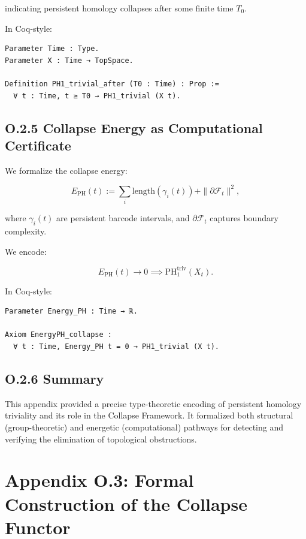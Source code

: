\documentclass[11pt]{article}
\begin{document}
indicating persistent homology collapses after some finite time \( T_0 \).

In Coq-style:

\begin{lstlisting}[language=Coq]
Parameter Time : Type.
Parameter X : Time → TopSpace.

Definition PH1_trivial_after (T0 : Time) : Prop :=
  ∀ t : Time, t ≥ T0 → PH1_trivial (X t).
\end{lstlisting}

\subsection*{O.2.5 Collapse Energy as Computational Certificate}

We formalize the collapse energy:

\[
E_{\mathrm{PH}}(t) := \sum_i \mathrm{length}(\gamma_i(t)) + \|\partial \mathcal{F}_t\|^2,
\]

where \( \gamma_i(t) \) are persistent barcode intervals, and \( \partial \mathcal{F}_t \) captures boundary complexity.

We encode:

\[
E_{\mathrm{PH}}(t) \to 0 \implies \mathrm{PH}_1^{\mathrm{triv}}(X_t).
\]

In Coq-style:

\begin{lstlisting}[language=Coq]
Parameter Energy_PH : Time → ℝ.

Axiom EnergyPH_collapse :
  ∀ t : Time, Energy_PH t = 0 → PH1_trivial (X t).
\end{lstlisting}

\subsection*{O.2.6 Summary}

This appendix provided a precise type-theoretic encoding of persistent homology triviality and its role in the Collapse Framework.  
It formalized both structural (group-theoretic) and energetic (computational) pathways for detecting and verifying the elimination of topological obstructions.



\section*{Appendix O.3: Formal Construction of the Collapse Functor}
\end{document}
